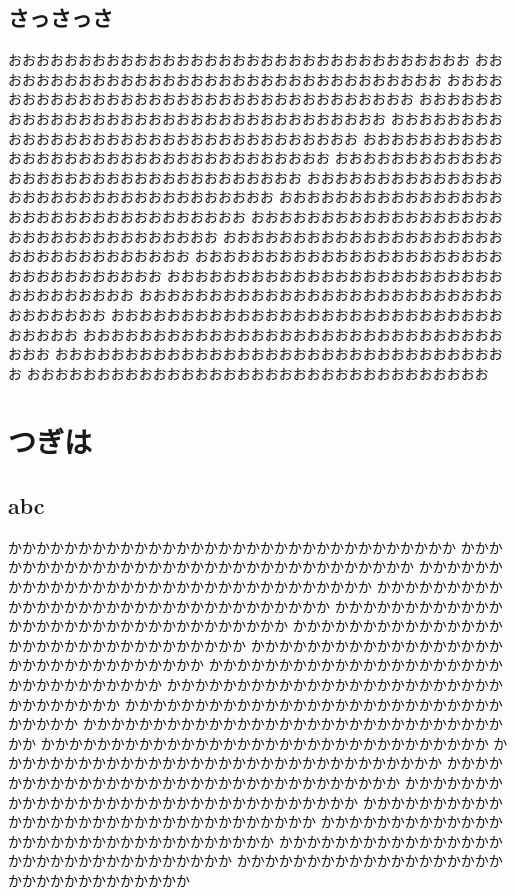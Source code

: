 \documentclass{jbook}
\begin{document}
\section{さっさっさ}
おおおおおおおおおおおおおおおおおおおおおおおおおおおおおおおおお
おおおおおおおおおおおおおおおおおおおおおおおおおおおおおおおおお
おおおおおおおおおおおおおおおおおおおおおおおおおおおおおおおおお
おおおおおおおおおおおおおおおおおおおおおおおおおおおおおおおおお
おおおおおおおおおおおおおおおおおおおおおおおおおおおおおおおおお
おおおおおおおおおおおおおおおおおおおおおおおおおおおおおおおおお
おおおおおおおおおおおおおおおおおおおおおおおおおおおおおおおおお
おおおおおおおおおおおおおおおおおおおおおおおおおおおおおおおおお
おおおおおおおおおおおおおおおおおおおおおおおおおおおおおおおおお
おおおおおおおおおおおおおおおおおおおおおおおおおおおおおおおおお
おおおおおおおおおおおおおおおおおおおおおおおおおおおおおおおおお
おおおおおおおおおおおおおおおおおおおおおおおおおおおおおおおおお
おおおおおおおおおおおおおおおおおおおおおおおおおおおおおおおおお
おおおおおおおおおおおおおおおおおおおおおおおおおおおおおおおおお
おおおおおおおおおおおおおおおおおおおおおおおおおおおおおおおおお
おおおおおおおおおおおおおおおおおおおおおおおおおおおおおおおおお
おおおおおおおおおおおおおおおおおおおおおおおおおおおおおおおおお
おおおおおおおおおおおおおおおおおおおおおおおおおおおおおおおおお
\chapter{つぎは}
\section{abc}
かかかかかかかかかかかかかかかかかかかかかかかかかかかかかかかか
かかかかかかかかかかかかかかかかかかかかかかかかかかかかかかかか
かかかかかかかかかかかかかかかかかかかかかかかかかかかかかかかか
かかかかかかかかかかかかかかかかかかかかかかかかかかかかかかかか
かかかかかかかかかかかかかかかかかかかかかかかかかかかかかかかか
かかかかかかかかかかかかかかかかかかかかかかかかかかかかかかかか
かかかかかかかかかかかかかかかかかかかかかかかかかかかかかかかか
かかかかかかかかかかかかかかかかかかかかかかかかかかかかかかかか
かかかかかかかかかかかかかかかかかかかかかかかかかかかかかかかか
かかかかかかかかかかかかかかかかかかかかかかかかかかかかかかかか
かかかかかかかかかかかかかかかかかかかかかかかかかかかかかかかか
かかかかかかかかかかかかかかかかかかかかかかかかかかかかかかかか
かかかかかかかかかかかかかかかかかかかかかかかかかかかかかかかか
かかかかかかかかかかかかかかかかかかかかかかかかかかかかかかかか
かかかかかかかかかかかかかかかかかかかかかかかかかかかかかかかか
かかかかかかかかかかかかかかかかかかかかかかかかかかかかかかかか
かかかかかかかかかかかかかかかかかかかかかかかかかかかかかかかか
かかかかかかかかかかかかかかかかかかかかかかかかかかかかかかかか
かかかかかかかかかかかかかかかかかかかかかかかかかかかかかかかか
\end{document}
